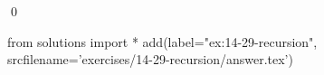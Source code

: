 
\begin{ex}
  \label{ex:14-29-recursion}
  
  \qed
\end{ex}
\begin{python0}
from solutions import *
add(label="ex:14-29-recursion",
    srcfilename='exercises/14-29-recursion/answer.tex')
\end{python0}
